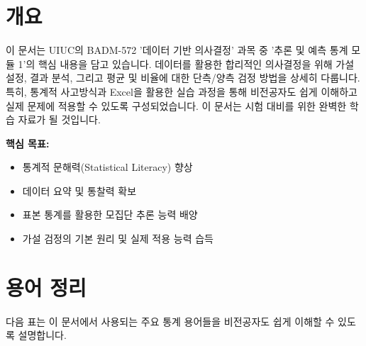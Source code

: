 \documentclass[11pt,a4paper]{article}
\begin{document}
\newpage
\section*{개요}
이 문서는 UIUC의 BADM-572 '데이터 기반 의사결정' 과목 중 '추론 및 예측 통계 모듈 1'의 핵심 내용을 담고 있습니다.
데이터를 활용한 합리적인 의사결정을 위해 가설 설정, 결과 분석, 그리고 평균 및 비율에 대한 단측/양측 검정 방법을 상세히 다룹니다.
특히, 통계적 사고방식과 Excel을 활용한 실습 과정을 통해 비전공자도 쉽게 이해하고 실제 문제에 적용할 수 있도록 구성되었습니다.
이 문서는 시험 대비를 위한 완벽한 학습 자료가 될 것입니다.

\vspace{1em}

\begin{summarybox}
\textbf{핵심 목표:}
\begin{itemize}
    \item 통계적 문해력(Statistical Literacy) 향상
    \item 데이터 요약 및 통찰력 확보
    \item 표본 통계를 활용한 모집단 추론 능력 배양
    \item 가설 검정의 기본 원리 및 실제 적용 능력 습득
\end{itemize}
\end{summarybox}

\newpage
\section*{용어 정리}

다음 표는 이 문서에서 사용되는 주요 통계 용어들을 비전공자도 쉽게 이해할 수 있도록 설명합니다.
\end{document}
